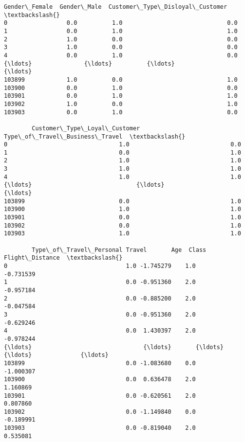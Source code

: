 \documentclass[11pt]{article}
\makeatletter
\newcommand{\boxspacing}{\kern\kvtcb@left@rule\kern\kvtcb@boxsep}
\newcommand{\prompt}[4]{
        {\ttfamily\llap{{\color{#2}[#3]:\hspace{3pt}#4}}\vspace{-\baselineskip}}
    }
\makeatother
\begin{document}
            \begin{tcolorbox}[breakable, size=fbox, boxrule=.5pt, pad at break*=1mm, opacityfill=0]
\prompt{Out}{outcolor}{18}{\boxspacing}
\begin{Verbatim}[commandchars=\\\{\}]
        Gender\_Female  Gender\_Male  Customer\_Type\_Disloyal\_Customer  \textbackslash{}
0                 0.0          1.0                              0.0
1                 0.0          1.0                              1.0
2                 1.0          0.0                              0.0
3                 1.0          0.0                              0.0
4                 0.0          1.0                              0.0
{\ldots}               {\ldots}          {\ldots}                              {\ldots}
103899            1.0          0.0                              1.0
103900            0.0          1.0                              0.0
103901            0.0          1.0                              1.0
103902            1.0          0.0                              1.0
103903            0.0          1.0                              0.0

        Customer\_Type\_Loyal\_Customer  Type\_of\_Travel\_Business\_Travel  \textbackslash{}
0                                1.0                             0.0
1                                0.0                             1.0
2                                1.0                             1.0
3                                1.0                             1.0
4                                1.0                             1.0
{\ldots}                              {\ldots}                             {\ldots}
103899                           0.0                             1.0
103900                           1.0                             1.0
103901                           0.0                             1.0
103902                           0.0                             1.0
103903                           1.0                             1.0

        Type\_of\_Travel\_Personal Travel       Age  Class  Flight\_Distance  \textbackslash{}
0                                  1.0 -1.745279    1.0        -0.731539
1                                  0.0 -0.951360    2.0        -0.957184
2                                  0.0 -0.885200    2.0        -0.047584
3                                  0.0 -0.951360    2.0        -0.629246
4                                  0.0  1.430397    2.0        -0.978244
{\ldots}                                {\ldots}       {\ldots}    {\ldots}              {\ldots}
103899                             0.0 -1.083680    0.0        -1.000307
103900                             0.0  0.636478    2.0         1.160869
103901                             0.0 -0.620561    2.0         0.807860
103902                             0.0 -1.149840    0.0        -0.189991
103903                             0.0 -0.819040    2.0         0.535081


\end{Verbatim}
\end{tcolorbox}
\end{document}
